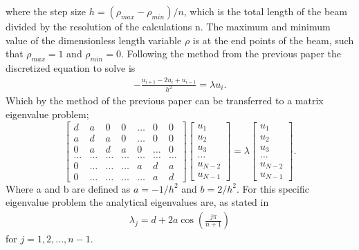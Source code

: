 \documentclass{emulateapj}
\begin{document}
%
where the step size $h = \left(\rho_{max} - \rho_{min}\right)/n$, which is the total length of the beam divided by the resolution of the calculations n. The maximum and minimum value of the dimensionless length variable $\rho$ is at the end points of the beam, such that $\rho_{max} = 1$ and $\rho_{min} = 0$. Following the method from the previous paper the discretized equation to solve is
%
\begin{gather*}
    -\frac{u_{i+1} - 2u_i + u_{i-1}}{h^2} = \lambda u_i.
\end{gather*}
Which by the method of the previous paper can be transferred to a matrix eigenvalue problem;
%
\begin{equation*}
    \begin{bmatrix} d& a & 0   & 0    & \dots  &0     & 0 \\
                                a & d & a & 0    & \dots  &0     &0 \\
                                0   & a & d & a  &0       &\dots & 0\\
                                \dots  & \dots & \dots & \dots  &\dots      &\dots & \dots\\
                                0   & \dots & \dots & \dots  &a  &d & a\\
                                0   & \dots & \dots & \dots  &\dots       &a & d\end{bmatrix} 
                                 \begin{bmatrix} u_1 \\ u_2 \\ u_3 \\ \dots \\ u_{N-2} \\ u_{N-1}\end{bmatrix} = \lambda \begin{bmatrix} u_1 \\ u_2 \\ u_3 \\ \dots \\ u_{N-2} \\ u_{N-1}\end{bmatrix} . 
\label{eq:matrixse} 
\end{equation*}
%
Where a and b are defined as $a = -1/h^2$ and $b = 2/h^2$. For this specific eigenvalue problem the analytical eigenvalues are, as stated in \cite{2}
%
\begin{gather}\label{eq:eigenvals_analytical}
    \lambda_j = d + 2a\cos\left(\frac{j\pi}{n+1}\right)
\end{gather}
for $j = 1,2,...,n-1$. 
\end{document}
